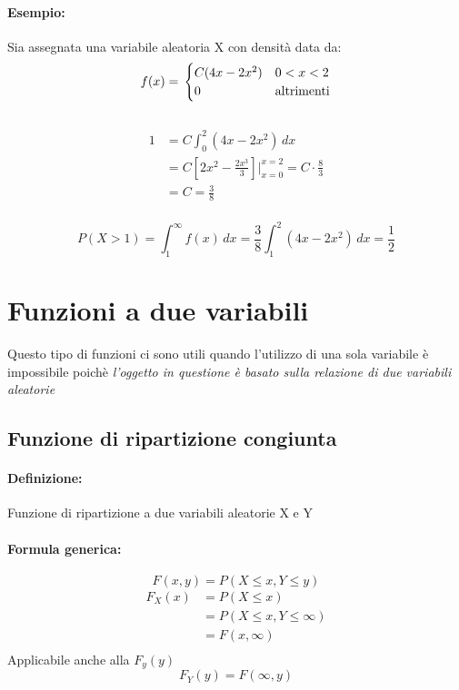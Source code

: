 \documentclass[]{article}
\newcommand{\definizione}{\paragraph{Definizione:}}
\newcommand{\formula}{\paragraph{Formula generica:}}
\begin{document}
    \paragraph{Esempio:} Sia assegnata una variabile aleatoria X con densità data da:
    \begin{equation*}
        f(x) = \\
        \begin{cases}
            C(4x - 2x^2) & 0 < x < 2 \\
            0 & \text{altrimenti}
        \end{cases}
    \end{equation*}
     \\
    \linebreak[4]
    \begin{equation*}
        \begin{split}
            1 & = C \int_{0}^{2} (4x - 2x^2) \, dx\\
            & = C[2x^2 - \frac{2x^3}{3}] \bigg\rvert_{x=0}^{x=2} = C \cdot \frac{8}{3} \\
            & = C = \frac{3}{8}
        \end{split}
    \end{equation*} \\
    \linebreak[4]
    \[ P(X > 1) = \int_{1}^{\infty} f(x) \, dx = \frac{3}{8} \int_{1}^{2}(4x - 2x^2) \, dx = \frac{1}{2} \]
    \newpage

    \section{Funzioni a due variabili}
    Questo tipo di funzioni ci sono utili quando l'utilizzo di una sola variabile è impossibile poichè 
    \textit{l'oggetto in questione è basato sulla relazione di due variabili aleatorie}
    \subsection{Funzione di ripartizione congiunta}
    \definizione Funzione di ripartizione a due variabili aleatorie X e Y
    \formula \[ F(x, y) = P(X \leq x, Y \leq y) \]
    \begin{equation*}
    \begin{split}
        F_X(x) & = P(X \leq x) \\
        & = P(X \leq x, Y \leq \infty) \\
        & = F(x, \infty) \\
    \end{split}
    \end{equation*}
    Applicabile anche alla $F_y(y)$
    \[ F_Y(y) = F(\infty, y) \]
\end{document}
